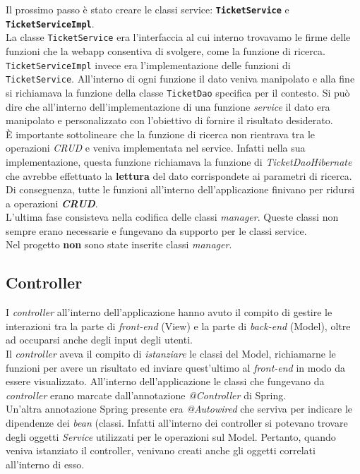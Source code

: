 \noindent
Il prossimo passo è stato creare le classi service: \texttt{\textbf{TicketService}} e \texttt{\textbf{TicketServiceImpl}}.\\
La classe \texttt{TicketService} era l'interfaccia al cui interno trovavamo le firme delle funzioni che la webapp consentiva di svolgere, come  la funzione di ricerca. \\
\texttt{TicketServiceImpl} invece era l'implementazione delle funzioni di \texttt{TicketService}. All'interno di ogni funzione il dato veniva manipolato e alla fine si richiamava la funzione della classe \texttt{TicketDao} specifica per il contesto. 
Si può dire che all'interno dell'implementazione di una funzione \textit{service} il dato era manipolato e personalizzato con l'obiettivo di fornire il risultato desiderato.\\

\noindent
È importante sottolineare che la funzione di ricerca non rientrava tra le operazioni \textit{CRUD} e veniva implementata nel service. Infatti nella sua implementazione, questa funzione richiamava la funzione di \textit{TicketDaoHibernate} che avrebbe effettuato la \textbf{lettura} del dato corrispondete ai parametri di ricerca.\\

\noindent
Di conseguenza, tutte le funzioni all'interno dell'applicazione finivano per ridursi a operazioni \textit{\textbf{CRUD}}.\\

\noindent
L'ultima fase consisteva nella codifica delle classi \textit{manager}. Queste classi non sempre erano necessarie e fungevano da supporto per le classi service. \\
Nel progetto \textbf{non} sono state inserite classi \textit{manager}.

\subsection*{Controller}
I \textit{controller} all'interno dell'applicazione hanno avuto il compito di gestire le interazioni tra la parte di \textit{front-end} (View) e la parte di \textit{back-end} (Model), oltre ad occuparsi anche degli input degli utenti.\\

\noindent
Il \textit{controller} aveva il compito di \textit{istanziare} le classi del Model, richiamarne le funzioni per avere un risultato ed inviare quest'ultimo al \textit{front-end} in modo da essere visualizzato.
All'interno dell'applicazione le classi che fungevano da \textit{controller} erano marcate dall'annotazione \textit{@Controller} di Spring.\\
Un'altra annotazione Spring presente era \textit{@Autowired} che serviva per indicare le dipendenze dei \textit{bean} (classi. Infatti all'interno dei controller si potevano trovare degli oggetti \textit{Service} utilizzati per le operazioni sul Model. Pertanto, quando veniva istanziato il controller, venivano creati anche gli oggetti correlati all'interno di esso.\\

